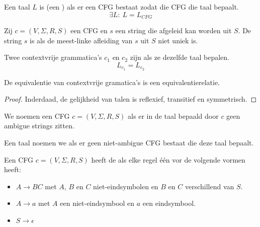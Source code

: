 \documentclass[main.tex]{subfiles}
\begin{document}
\begin{de}
  \label{de:contextvrije-taal}
  Een taal $L$ is  (een ) als er een CFG bestaat zodat die CFG die taal bepaalt.
  \[ \exists L:\ L = L_{CFG} \]
\end{de}

\begin{de}
  Zij $c = (V,\Sigma,R,S)$ een CFG en $s$ een string die afgeleid kan worden uit $S$.
  De string $s$ is  als de meest-linke afleiding van $s$ uit $S$ niet uniek is. 
\end{de}

\begin{de}
  Twee contextvrije grammatica's $c_{1}$ en $c_{2}$ zijn  als ze dezelfde taal bepalen.
  \[ L_{c_{1}} = L_{c_{2}} \]
\end{de}

\begin{st}
  De equivalentie van contextvrije gramatica's is een equivalentierelatie.

  \begin{proof}
    Inderdaad, de gelijkheid van talen is reflexief, transitief en symmetrisch.
  \end{proof}
\end{st}

\begin{de}
  We noemen een CFG $c = (V,\Sigma,R,S)$  als er in de taal bepaald door $c$ geen ambigue strings zitten.
\end{de}

\begin{de}
  Een taal noemen we  als er geen niet-ambigue CFG bestaat die deze taal bepaalt.
\end{de}

\begin{de}
  \label{de:chomsky-normaal-vorm}
  Een CFG $c = (V,\Sigma,R,S)$ heeft de  als elke regel \'e\'en vor de volgende vormen heeft:
  \begin{itemize}
  \item $A \rightarrow BC$ met $A$, $B$ en $C$ niet-eindsymbolen en $B$ en $C$ verschillend van $S$.
  \item $A \rightarrow a$ met $A$ een niet-eindsymbool en $a$ een eindsymbool.
  \item $S \rightarrow \epsilon$
  \end{itemize}
\end{de}
\end{document}
